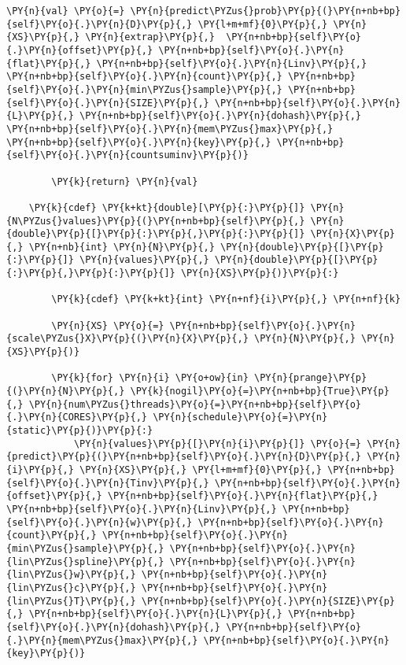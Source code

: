\begin{Verbatim}[commandchars=\\\{\}]
        \PY{n}{val} \PY{o}{=} \PY{n}{predict\PYZus{}prob}\PY{p}{(}\PY{n+nb+bp}{self}\PY{o}{.}\PY{n}{D}\PY{p}{,} \PY{l+m+mf}{0}\PY{p}{,} \PY{n}{XS}\PY{p}{,} \PY{n}{extrap}\PY{p}{,}  \PY{n+nb+bp}{self}\PY{o}{.}\PY{n}{offset}\PY{p}{,} \PY{n+nb+bp}{self}\PY{o}{.}\PY{n}{flat}\PY{p}{,} \PY{n+nb+bp}{self}\PY{o}{.}\PY{n}{Linv}\PY{p}{,} \PY{n+nb+bp}{self}\PY{o}{.}\PY{n}{count}\PY{p}{,} \PY{n+nb+bp}{self}\PY{o}{.}\PY{n}{min\PYZus{}sample}\PY{p}{,} \PY{n+nb+bp}{self}\PY{o}{.}\PY{n}{SIZE}\PY{p}{,} \PY{n+nb+bp}{self}\PY{o}{.}\PY{n}{L}\PY{p}{,} \PY{n+nb+bp}{self}\PY{o}{.}\PY{n}{dohash}\PY{p}{,} \PY{n+nb+bp}{self}\PY{o}{.}\PY{n}{mem\PYZus{}max}\PY{p}{,} \PY{n+nb+bp}{self}\PY{o}{.}\PY{n}{key}\PY{p}{,} \PY{n+nb+bp}{self}\PY{o}{.}\PY{n}{countsuminv}\PY{p}{)}
   
        \PY{k}{return} \PY{n}{val}

    \PY{k}{cdef} \PY{k+kt}{double}[\PY{p}{:}\PY{p}{]} \PY{n}{N\PYZus{}values}\PY{p}{(}\PY{n+nb+bp}{self}\PY{p}{,} \PY{n}{double}\PY{p}{[}\PY{p}{:}\PY{p}{,}\PY{p}{:}\PY{p}{]} \PY{n}{X}\PY{p}{,} \PY{n+nb}{int} \PY{n}{N}\PY{p}{,} \PY{n}{double}\PY{p}{[}\PY{p}{:}\PY{p}{]} \PY{n}{values}\PY{p}{,} \PY{n}{double}\PY{p}{[}\PY{p}{:}\PY{p}{,}\PY{p}{:}\PY{p}{]} \PY{n}{XS}\PY{p}{)}\PY{p}{:}
        
        \PY{k}{cdef} \PY{k+kt}{int} \PY{n+nf}{i}\PY{p}{,} \PY{n+nf}{k}
        
        \PY{n}{XS} \PY{o}{=} \PY{n+nb+bp}{self}\PY{o}{.}\PY{n}{scale\PYZus{}X}\PY{p}{(}\PY{n}{X}\PY{p}{,} \PY{n}{N}\PY{p}{,} \PY{n}{XS}\PY{p}{)}

        \PY{k}{for} \PY{n}{i} \PY{o+ow}{in} \PY{n}{prange}\PY{p}{(}\PY{n}{N}\PY{p}{,} \PY{k}{nogil}\PY{o}{=}\PY{n+nb+bp}{True}\PY{p}{,} \PY{n}{num\PYZus{}threads}\PY{o}{=}\PY{n+nb+bp}{self}\PY{o}{.}\PY{n}{CORES}\PY{p}{,} \PY{n}{schedule}\PY{o}{=}\PY{n}{static}\PY{p}{)}\PY{p}{:}
            \PY{n}{values}\PY{p}{[}\PY{n}{i}\PY{p}{]} \PY{o}{=} \PY{n}{predict}\PY{p}{(}\PY{n+nb+bp}{self}\PY{o}{.}\PY{n}{D}\PY{p}{,} \PY{n}{i}\PY{p}{,} \PY{n}{XS}\PY{p}{,} \PY{l+m+mf}{0}\PY{p}{,} \PY{n+nb+bp}{self}\PY{o}{.}\PY{n}{Tinv}\PY{p}{,} \PY{n+nb+bp}{self}\PY{o}{.}\PY{n}{offset}\PY{p}{,} \PY{n+nb+bp}{self}\PY{o}{.}\PY{n}{flat}\PY{p}{,} \PY{n+nb+bp}{self}\PY{o}{.}\PY{n}{Linv}\PY{p}{,} \PY{n+nb+bp}{self}\PY{o}{.}\PY{n}{w}\PY{p}{,} \PY{n+nb+bp}{self}\PY{o}{.}\PY{n}{count}\PY{p}{,} \PY{n+nb+bp}{self}\PY{o}{.}\PY{n}{min\PYZus{}sample}\PY{p}{,} \PY{n+nb+bp}{self}\PY{o}{.}\PY{n}{lin\PYZus{}spline}\PY{p}{,} \PY{n+nb+bp}{self}\PY{o}{.}\PY{n}{lin\PYZus{}w}\PY{p}{,} \PY{n+nb+bp}{self}\PY{o}{.}\PY{n}{lin\PYZus{}c}\PY{p}{,} \PY{n+nb+bp}{self}\PY{o}{.}\PY{n}{lin\PYZus{}T}\PY{p}{,} \PY{n+nb+bp}{self}\PY{o}{.}\PY{n}{SIZE}\PY{p}{,} \PY{n+nb+bp}{self}\PY{o}{.}\PY{n}{L}\PY{p}{,} \PY{n+nb+bp}{self}\PY{o}{.}\PY{n}{dohash}\PY{p}{,} \PY{n+nb+bp}{self}\PY{o}{.}\PY{n}{mem\PYZus{}max}\PY{p}{,} \PY{n+nb+bp}{self}\PY{o}{.}\PY{n}{key}\PY{p}{)}
    

\end{Verbatim}
